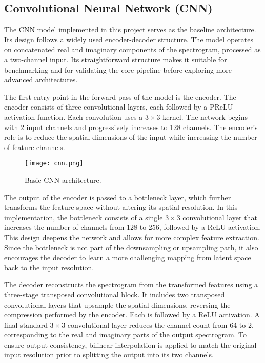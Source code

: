 \subsection{Convolutional Neural Network (CNN)}
\label{sec:cnn}

The CNN model implemented in this project serves as the baseline architecture. Its design follows a widely used encoder-decoder structure. The model operates on concatenated real and imaginary components of the spectrogram, processed as a two-channel input. Its straightforward structure makes it suitable for benchmarking and for validating the core pipeline before exploring more advanced architectures.

The first entry point in the forward pass of the model is the encoder. The encoder consists of three convolutional layers, each followed by a PReLU activation function. Each convolution uses a \(3 \times 3\) kernel. The network begins with 2 input channels and progressively increases to 128 channels. The encoder's role is to reduce the spatial dimensions of the input while increasing the number of feature channels.

\begin{figure}[h]
    \centering
    \texttt{[image: cnn.png]}
    \caption{\label{fig:cnn}Basic CNN architecture.}
\end{figure}

The output of the encoder is passed to a bottleneck layer, which further transforms the feature space without altering its spatial resolution. In this implementation, the bottleneck consists of a single \(3 \times 3\) convolutional layer that increases the number of channels from 128 to 256, followed by a ReLU activation. This design deepens the network and allows for more complex feature extraction. Since the bottleneck is not part of the downsampling or upsampling path, it also encourages the decoder to learn a more challenging mapping from latent space back to the input resolution.

The decoder reconstructs the spectrogram from the transformed features using a three-stage transposed convolutional block. It includes two transposed convolutional layers that upsample the spatial dimensions, reversing the compression performed by the encoder. Each is followed by a ReLU activation. A final standard \(3 \times 3\) convolutional layer reduces the channel count from 64 to 2, corresponding to the real and imaginary parts of the output spectrogram. To ensure output consistency, bilinear interpolation is applied to match the original input resolution prior to splitting the output into its two channels.

